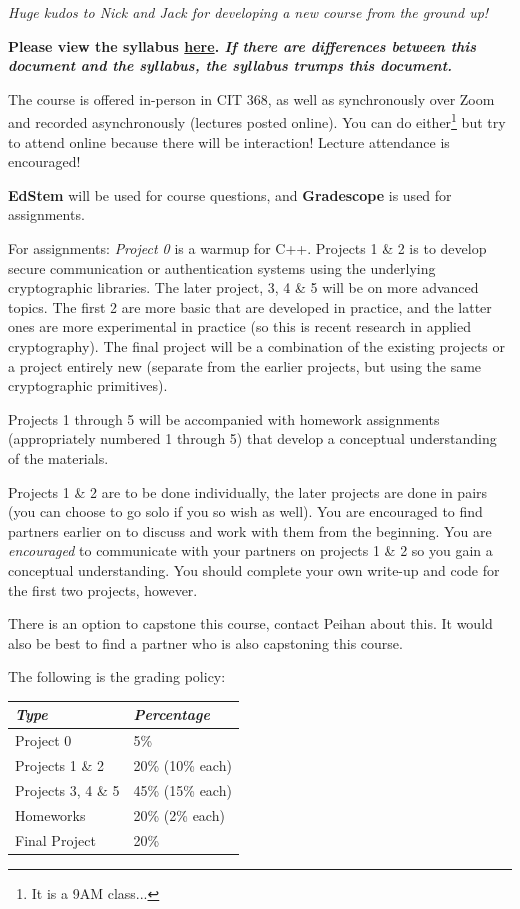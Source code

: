 \emph{Huge kudos to Nick and Jack for developing a new course from the ground up!}

\textbf{Please view the syllabus \href{https://docs.google.com/document/d/1SPlL17ee0XNtt4GF7FIcEp9pzA80lRHKfBE1bLBKImE/edit?usp=sharing}{here}. \emph{If there are differences between this document and the syllabus, the syllabus trumps this document.}}

The course is offered in-person in CIT 368, as well as synchronously over Zoom and recorded asynchronously (lectures posted online). You can do either\footnote{It is a 9AM class...} but try to attend online because there will be interaction! Lecture attendance is encouraged!

\textbf{EdStem} will be used for course questions, and \textbf{Gradescope} is used for assignments.

For assignments: \emph{Project 0} is a warmup for C++. Projects 1 \& 2 is to develop secure communication or authentication systems using the underlying cryptographic libraries. The later project, 3, 4 \& 5 will be on more advanced topics. The first 2 are more basic that are developed in practice, and the latter ones are more experimental in practice (so this is recent research in applied cryptography). The final project will be a combination of the existing projects or a project entirely new (separate from the earlier projects, but using the same cryptographic primitives).

Projects 1 through 5 will be accompanied with homework assignments (appropriately numbered 1 through 5) that develop a conceptual understanding of the materials.

Projects 1 \& 2 are to be done individually, the later projects are done in pairs (you can choose to go solo if you so wish as well). You are encouraged to find partners earlier on to discuss and work with them from the beginning. You are \emph{encouraged} to communicate with your partners on projects 1 \& 2 so you gain a conceptual understanding. You should complete your own write-up and code for the first two projects, however.

There is an option to capstone this course, contact Peihan about this. It would also be best to find a partner who is also capstoning this course.

The following is the grading policy:
\begin{center}
    \begin{tabular}{@{}ll@{}}
        \toprule
        \textit{Type}      & \textit{Percentage} \\ \midrule
        Project 0          & 5\%                 \\
        Projects 1 \& 2    & 20\% (10\% each)    \\
        Projects 3, 4 \& 5 & 45\% (15\% each)    \\
        Homeworks          & 20\% (2\% each)     \\
        Final Project      & 20\%                \\ \bottomrule
    \end{tabular}
\end{center}

